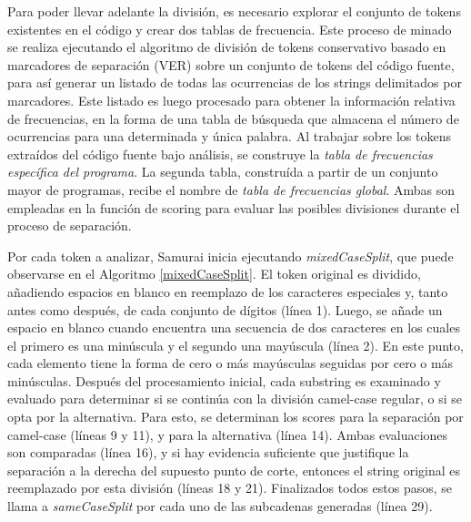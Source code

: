 Para poder llevar adelante la división, es necesario explorar el conjunto de tokens existentes en el código y crear dos tablas de frecuencia.
Este proceso de minado se realiza ejecutando el algoritmo de división de tokens conservativo basado en marcadores de separación (VER) sobre un conjunto de tokens del código fuente, para así generar un listado de todas las ocurrencias de los strings delimitados por marcadores.
Este listado es luego procesado para obtener la información relativa de frecuencias, en la forma de una tabla de búsqueda que almacena el número de ocurrencias para una determinada y única palabra.
Al trabajar sobre los tokens extraídos del código fuente bajo análisis, se construye  la \textit{tabla de frecuencias específica del programa}.
La segunda tabla, construída a partir de un conjunto mayor de programas, recibe el nombre de \textit{tabla de frecuencias global}.
Ambas son empleadas en la función de scoring para evaluar las posibles divisiones durante el proceso de separación.

Por cada token a analizar, Samurai inicia ejecutando \textit{mixedCaseSplit}, que puede observarse en el Algoritmo \ref{mixedCaseSplit}.
El token original es dividido, añadiendo espacios en blanco en reemplazo de los caracteres especiales y, tanto antes como después, de cada conjunto de dígitos (línea 1).
Luego, se añade un espacio en blanco cuando encuentra una secuencia de dos caracteres en los cuales el primero es una minúscula y el segundo una mayúscula (línea 2). En este punto, cada elemento tiene la forma de cero o más mayúsculas seguidas por cero o más minúsculas.
Después del procesamiento inicial, cada substring es examinado y evaluado para determinar si se continúa con la división camel-case regular, o si se opta por la alternativa. Para esto, se determinan los scores para la separación por camel-case (líneas 9 y 11), y para la alternativa (línea 14).
Ambas evaluaciones son comparadas (línea 16), y si hay evidencia suficiente que justifique la separación a la derecha del supuesto punto de corte, entonces el string original es reemplazado por esta división (líneas 18 y 21).
Finalizados todos estos pasos, se llama a \textit{sameCaseSplit} por cada uno de las subcadenas generadas (línea 29).

